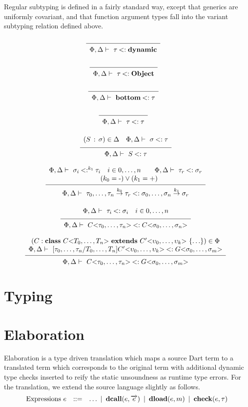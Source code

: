 \documentclass[fleqn, draft]{article}
\makeatletter
\newcommand{\Arrow}[3][-]{#2 \overset{#1}{\rightarrow} #3}
\newcommand{\Bottom}{\mathbf{bottom}}
\newcommand{\Dynamic}{\mathbf{dynamic}}
\newcommand{\Object}{\mathbf{Object}}
\newcommand{\TApp}[2]{#1\mathrm{<}#2\mathrm{>}}
\newcommand{\echeck}[2]{\kwop{check}(#1, #2)}
\newcommand{\edcall}[2]{\kwop{dcall}(#1, #2)}
\newcommand{\edload}[2]{\kwop{dload}(#1, #2)}
\newcommand{\kwclass}{\kw{class}}
\newcommand{\kwextends}{\kw{extends}}
\newcommand{\dclass}[3]{\kwclass\ #1\ \kwextends\ #2\ \{#3\}}
\newcommand{\sub}{\mathbin{<:}}
\newcommand{\many}[1]{\overrightarrow{#1}}
\newcommand{\alt}{\ \mathop{|}\ }
\newcommand{\infrulem}[3][]{
  \begin{array}{c@{\ }c}
    \begin{array}{cccc}
      #2 \vspace{-2mm} 
    \end{array} \\
    \hrulefill & #1 \\
    \begin{array}{l}
      #3
    \end{array}
  \end{array}
  }
\newcommand{\axiomm}[2][]{
  \begin{array}{cc}
    \hrulefill & #1 \\
    \begin{array}{c}
      #2
    \end{array}
  \end{array}
  }
\newcommand{\infrule}[3][]{
  \[ 
  \infrulem[#1]{#2}{#3}
  \]
  }
\newcommand{\axiom}[2][]{
  \[ 
  \axiomm[#1]{#2}
  \]
  }
\newcommand{\subst}[2]{[#1/#2]}
\newcommand{\subtypeOf}[4][]{#2 \vdash\ #3 \sub^{#1} #4}
\makeatother
\begin{document}
Regular subtyping is defined in a fairly standard way, except that generics are
uniformly covariant, and that function argument types fall into the variant
subtyping relation defined above.

\axiom{\subtypeOf{\Phi, \Delta}{\tau}{\Dynamic}}

\axiom{\subtypeOf{\Phi, \Delta}{\tau}{\Object}} 

\axiom{\subtypeOf{\Phi, \Delta}{\Bottom}{\tau}}

\axiom{\subtypeOf{\Phi, \Delta}{\tau}{\tau}} 

\infrule{(S\, :\, \sigma) \in \Delta \quad
         \subtypeOf{\Phi, \Delta}{\sigma}{\tau}}
        {\subtypeOf{\Phi, \Delta}{S}{\tau}} 

\infrule{\subtypeOf[k_1]{\Phi, \Delta}{\sigma_i}{\tau_i} \quad i \in 0, \ldots, n \quad\quad
         \subtypeOf{\Phi, \Delta}{\tau_r}{\sigma_r} \\
         \quad (k_0 = \mbox{-}) \lor (k_1 = \mbox{+})
        } 
        {\subtypeOf{\Phi, \Delta}
                   {\Arrow[k_0]{\tau_0, \ldots, \tau_n}{\tau_r}}
                   {\Arrow[k_1]{\sigma_0, \ldots, \sigma_n}{\sigma_r}}} 

\infrule{\subtypeOf{\Phi, \Delta}{\tau_i}{\sigma_i} & i \in 0, \ldots, n}
        {\subtypeOf{\Phi, \Delta}
          {\TApp{C}{\tau_0, \ldots, \tau_n}}
          {\TApp{C}{\sigma_0, \ldots, \sigma_n}}}

\infrule{(C : \dclass{\TApp{C}{T_0,\ldots,T_n}}{\TApp{C'}{\upsilon_0, \ldots, \upsilon_k}}{\ldots}) \in \Phi \\
         \subtypeOf{\Phi, \Delta}{\subst{\tau_0, \ldots, \tau_n}{T_0, \ldots, T_n}{\TApp{C'}{\upsilon_0, \ldots, \upsilon_k}}}{\TApp{G}{\sigma_0, \ldots, \sigma_m}}}
        {\subtypeOf{\Phi, \Delta}
          {\TApp{C}{\tau_0, \ldots, \tau_n}}
          {\TApp{G}{\sigma_0, \ldots, \sigma_m}}}



\section*{Typing}


\pagebreak
\section*{Elaboration}

Elaboration is a type driven translation which maps a source Dart term to a
translated term which corresponds to the original term with additional dynamic
type checks inserted to reify the static unsoundness as runtime type errors.
For the translation, we extend the source language slightly as follows.
\[
\begin{array}{lcl}
\text{Expressions $e$} & ::= & \ldots 
   \alt \edcall{e}{\many{e}} \alt \edload{e}{m} \alt \echeck{e}{\tau}\\
\end{array}
\]
\end{document}
